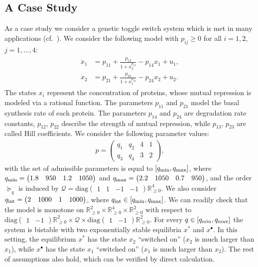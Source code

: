 \documentclass[letterpaper, 10pt, journal]{IEEEtran}  %
\newcommand{\Rnn}{{\mathbb R}_{\ge 0}}
\newcommand{\cQ}{{\mathcal Q}}
\newcommand{\diag}{{\mathrm{diag}}}
\begin{document}
\subsection{A Case Study} 
As a case study we consider a genetic toggle switch system which is met in many applications (cf.~\cite{Gardner00}). We consider the following model with $p_{i j} \ge 0$ for all $i = 1,2$, $j =1,\dots, 4$:
\begin{gather}\label{sys:toggle-2d}
\begin{aligned}
\dot x_1 &= p_{1 1} + \frac{p_{1 2}}{ 1 + x_2^{p_{1 3}}} - p_{1 4} x_1 + u_1, \\
\dot x_2 &= p_{2 1} + \frac{p_{2 2}}{ 1 + x_1^{p_{2 3}}} - p_{2 4} x_2 + u_2.
\end{aligned}
\end{gather}
The states $x_{i}$ represent the concentration of proteins, whose mutual repression is modeled via a rational function. The parameters $p_{1 1}$ and $p_{2 1}$ model the basal synthesis rate of each protein. The parameters $p_{1 4}$ and $p_{2 4}$ are degradation rate constants, $p_{1 2}$, $p_{2 2}$ describe the strength of mutual repression, while $p_{1 3}$, $p_{2 3}$ are called Hill coefficients. We consider the following parameter values:
\begin{gather*}
p = \begin{pmatrix}
q_1 & q_2 & 4 & 1 \\ q_3 & q_4 & 3 & 2
\end{pmatrix},
\end{gather*}
with the set of admissible parameters is equal to $[q_{\rm min}, q_{\rm max}]$, where $q_{\rm min} = \begin{pmatrix}
1.8 & 950 &  1.2 & 1050 
\end{pmatrix}$ and
$q_{\rm max} = \begin{pmatrix}
2.2 & 1050 & 0.7 & 950 
\end{pmatrix}$, and the order $\succeq_q$ is induced by $\cQ =\diag{\begin{pmatrix} 1 & 1 & -1 & -1\end{pmatrix}}\Rnn^4$. We also consider $q_{\rm int} = \begin{pmatrix} 2 & 1000 & 1 & 1000 
\end{pmatrix}$, where $q_{\rm int}\in [q_{\rm min}, q_{\rm max}]$. We can readily check that the model is monotone on $\Rnn^2\times \Rnn^4 \times\Rnn^2$ with respect to $\diag{\begin{pmatrix} 1 & -1 \end{pmatrix}} \Rnn^2\times\cQ \times \diag{\begin{pmatrix} 1 & -1 \end{pmatrix}} \Rnn^2$.  For every $q \in [q_{\rm min}, q_{\rm max}]$ the system is bistable with two exponentially stable equilibria $x^\ast$ and $x^\bullet$.
In this setting, the equilibrium $x^\ast$ has the state $x_2$ ``switched on'' ($x_2$ is much larger than $x_1$), while $x^\bullet$ has the state $x_1$ ``switched on'' ($x_1$ is much larger than $x_2$). The rest of assumptions also hold, which can be verified by direct calculation.
\end{document}
